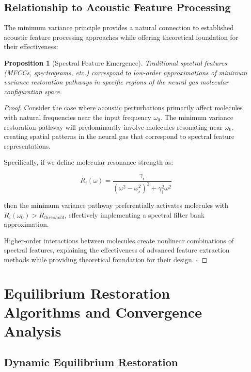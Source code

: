 \documentclass[12pt,a4paper]{article}
\newtheorem{proposition}[theorem]{Proposition}
\begin{document}
\subsection{Relationship to Acoustic Feature Processing}

The minimum variance principle provides a natural connection to established acoustic feature processing approaches while offering theoretical foundation for their effectiveness:

\begin{proposition}[Spectral Feature Emergence]
Traditional spectral features (MFCCs, spectrograms, etc.) correspond to low-order approximations of minimum variance restoration pathways in specific regions of the neural gas molecular configuration space.
\end{proposition}

\begin{proof}
Consider the case where acoustic perturbations primarily affect molecules with natural frequencies near the input frequency $\omega_0$. The minimum variance restoration pathway will predominantly involve molecules resonating near $\omega_0$, creating spatial patterns in the neural gas that correspond to spectral feature representations.

Specifically, if we define molecular resonance strength as:

\begin{equation}
R_i(\omega) = \frac{\gamma_i}{\left( \omega^2 - \omega_i^2 \right)^2 + \gamma_i^2 \omega^2}
\end{equation}

then the minimum variance pathway preferentially activates molecules with $R_i(\omega_0) > R_{threshold}$, effectively implementing a spectral filter bank approximation.

Higher-order interactions between molecules create nonlinear combinations of spectral features, explaining the effectiveness of advanced feature extraction methods while providing theoretical foundation for their design. $\square$
\end{proof}

\section{Equilibrium Restoration Algorithms and Convergence Analysis}

\subsection{Dynamic Equilibrium Restoration}
\end{document}
